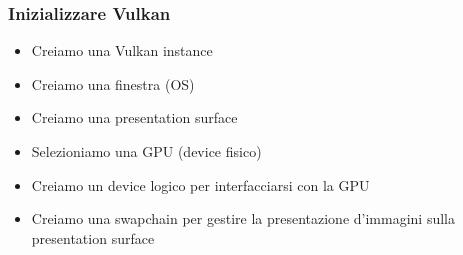 \begin{frame}
\frametitle{Inizializzare Vulkan}

\begin{itemize}
\item Creiamo una Vulkan instance
\item Creiamo una finestra (OS)
\item Creiamo una presentation surface
\item Selezioniamo una GPU (device fisico)
\item Creiamo un device logico per interfacciarsi con la GPU
\item Creiamo una swapchain per gestire la presentazione d'immagini sulla presentation surface
\end{itemize}

\end{frame}
